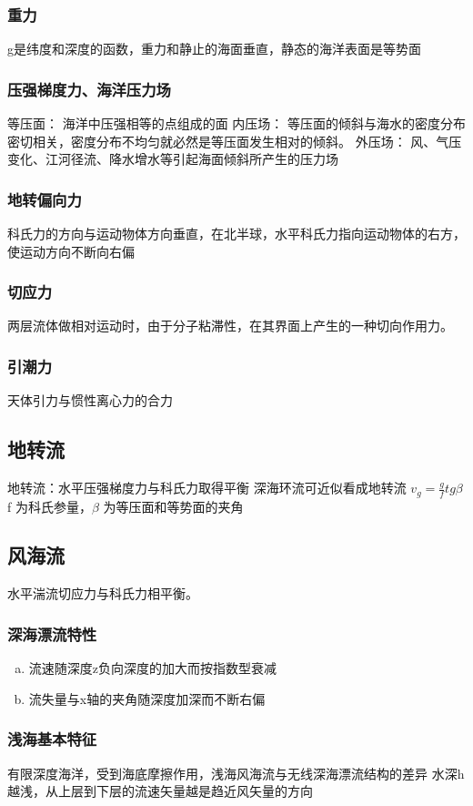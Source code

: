 	\subsubsection{重力}
	g是纬度和深度的函数，重力和静止的海面垂直，静态的海洋表面是等势面
	\subsubsection{压强梯度力、海洋压力场}
	等压面： 海洋中压强相等的点组成的面
	内压场： 等压面的倾斜与海水的密度分布密切相关，密度分布不均匀就必然是等压面发生相对的倾斜。
	外压场： 风、气压变化、江河径流、降水增水等引起海面倾斜所产生的压力场
	\subsubsection{地转偏向力}
	科氏力的方向与运动物体方向垂直，在北半球，水平科氏力指向运动物体的右方，使运动方向不断向右偏
	\subsubsection{切应力}
	 两层流体做相对运动时，由于分子粘滞性，在其界面上产生的一种切向作用力。
	 \subsubsection{引潮力}
	 天体引力与惯性离心力的合力

\subsection{地转流}
地转流：水平压强梯度力与科氏力取得平衡
深海环流可近似看成地转流
$v_g=\frac{g}{f}tg\beta$
f 为科氏参量，$\beta$ 为等压面和等势面的夹角
\subsection{风海流}
水平湍流切应力与科氏力相平衡。
	\subsubsection{深海漂流特性}
	\begin{enumerate} [a)]
		\item 流速随深度z负向深度的加大而按指数型衰减
		\item 流失量与x轴的夹角随深度加深而不断右偏
	\end{enumerate}
	
	\subsubsection{浅海基本特征}
	有限深度海洋，受到海底摩擦作用，浅海风海流与无线深海漂流结构的差异
	水深h越浅，从上层到下层的流速矢量越是趋近风矢量的方向
